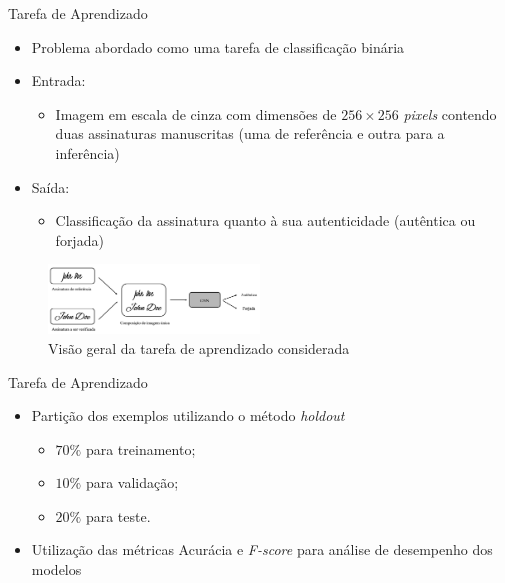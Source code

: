 
\begin{frame}{Tarefa de Aprendizado}
  \baselineskip
	\begin{itemize}
	\item Problema abordado como uma \alert{tarefa de classificação binária}
	\item \alert{Entrada:}
	\begin{itemize}
		\item Imagem em escala de cinza com dimensões de $256 \times 256$ \emph{pixels} contendo duas assinaturas manuscritas (uma de referência e outra para a inferência)
	\end{itemize}
	\item \alert{Saída:}
	\begin{itemize}
		\item Classificação da assinatura quanto à sua autenticidade (autêntica ou forjada)
	\end{itemize}
	\end{itemize}

	\begin{figure}
		\caption{Visão geral da tarefa de aprendizado considerada}
		\label{fig:esquema-solucao}
		\includegraphics[width=0.5\textwidth]{img/esquema-solucao}
	\end{figure}
\end{frame}

\begin{frame}{Tarefa de Aprendizado}

\begin{itemize}
  \item Partição dos exemplos utilizando o método \emph{holdout}
    \begin{itemize}
      \item $70\%$ para treinamento;
      \item $10\%$ para validação;
      \item $20\%$ para teste.
    \end{itemize}
  \bigskip
  \item Utilização das métricas Acurácia e \emph{F-score} para análise de desempenho dos modelos
\end{itemize}

\end{frame}

